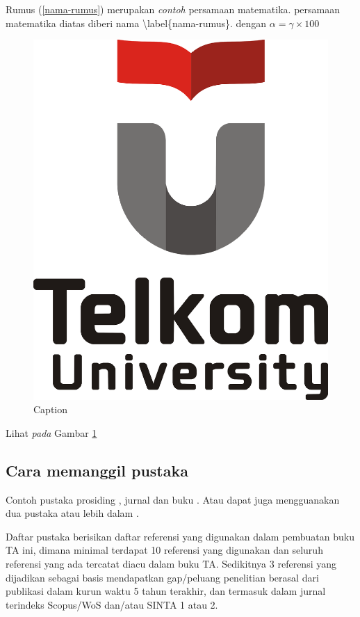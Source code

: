 Rumus (\ref{nama-rumus}) merupakan \textit{contoh} persamaan matematika. persamaan matematika diatas diberi nama \textbackslash label\{nama-rumus\}. dengan $\alpha=\gamma \times 100$

\begin{figure}[h!]
    \centering
    \includegraphics[scale=0.3]{Tel-U-Logo.png}
    \caption{Caption}
    \label{fig:my_label}
\end{figure}

Lihat \textit{pada} Gambar \ref{fig:my_label}

\subsection{Cara memanggil pustaka}
Contoh pustaka prosiding \cite{doyen2014explicit}, jurnal \cite{gunawan2015hydrostatic} dan buku \cite{toro2013riemann}. Atau dapat juga mengguanakan dua pustaka atau lebih dalam \cite{gunawan2015hydrostatic,toro2013riemann}.

Daftar pustaka berisikan daftar referensi yang digunakan dalam pembuatan buku TA ini, dimana minimal terdapat 10 referensi yang digunakan dan seluruh referensi yang ada tercatat diacu dalam buku TA. Sedikitnya 3 referensi yang dijadikan sebagai basis mendapatkan gap/peluang penelitian berasal dari publikasi dalam kurun waktu 5 tahun terakhir, dan termasuk dalam jurnal terindeks Scopus/WoS dan/atau SINTA 1 atau 2.